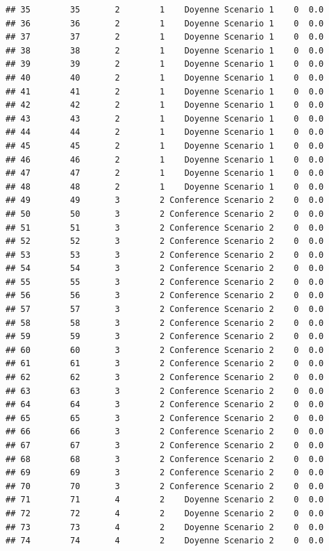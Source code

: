 \documentclass[
]{article}
\begin{document}
\begin{verbatim}
## 35        35       2        1    Doyenne Scenario 1    0  0.0
## 36        36       2        1    Doyenne Scenario 1    0  0.0
## 37        37       2        1    Doyenne Scenario 1    0  0.0
## 38        38       2        1    Doyenne Scenario 1    0  0.0
## 39        39       2        1    Doyenne Scenario 1    0  0.0
## 40        40       2        1    Doyenne Scenario 1    0  0.0
## 41        41       2        1    Doyenne Scenario 1    0  0.0
## 42        42       2        1    Doyenne Scenario 1    0  0.0
## 43        43       2        1    Doyenne Scenario 1    0  0.0
## 44        44       2        1    Doyenne Scenario 1    0  0.0
## 45        45       2        1    Doyenne Scenario 1    0  0.0
## 46        46       2        1    Doyenne Scenario 1    0  0.0
## 47        47       2        1    Doyenne Scenario 1    0  0.0
## 48        48       2        1    Doyenne Scenario 1    0  0.0
## 49        49       3        2 Conference Scenario 2    0  0.0
## 50        50       3        2 Conference Scenario 2    0  0.0
## 51        51       3        2 Conference Scenario 2    0  0.0
## 52        52       3        2 Conference Scenario 2    0  0.0
## 53        53       3        2 Conference Scenario 2    0  0.0
## 54        54       3        2 Conference Scenario 2    0  0.0
## 55        55       3        2 Conference Scenario 2    0  0.0
## 56        56       3        2 Conference Scenario 2    0  0.0
## 57        57       3        2 Conference Scenario 2    0  0.0
## 58        58       3        2 Conference Scenario 2    0  0.0
## 59        59       3        2 Conference Scenario 2    0  0.0
## 60        60       3        2 Conference Scenario 2    0  0.0
## 61        61       3        2 Conference Scenario 2    0  0.0
## 62        62       3        2 Conference Scenario 2    0  0.0
## 63        63       3        2 Conference Scenario 2    0  0.0
## 64        64       3        2 Conference Scenario 2    0  0.0
## 65        65       3        2 Conference Scenario 2    0  0.0
## 66        66       3        2 Conference Scenario 2    0  0.0
## 67        67       3        2 Conference Scenario 2    0  0.0
## 68        68       3        2 Conference Scenario 2    0  0.0
## 69        69       3        2 Conference Scenario 2    0  0.0
## 70        70       3        2 Conference Scenario 2    0  0.0
## 71        71       4        2    Doyenne Scenario 2    0  0.0
## 72        72       4        2    Doyenne Scenario 2    0  0.0
## 73        73       4        2    Doyenne Scenario 2    0  0.0
## 74        74       4        2    Doyenne Scenario 2    0  0.0

\end{verbatim}
\end{document}

